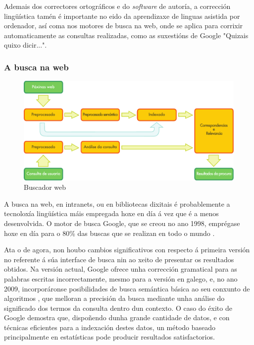 \begin{multicols}{2}
Ademais dos correctores ortográficos e do \textit{software} de autoría, a corrección lingüística tamén é importante no eido da aprendizaxe de linguas asistida por ordenador, así coma nos motores de busca na web, onde se aplica para corrixir automaticamente as consultas realizadas, como as suxestións de Google "Quizais quixo dicir...". 


\subsubsection{A busca na web}

\begin{figure}[htb]
  \center
  \includegraphics[width=\textwidth]{../_media/galician/web_search_architecture}
  \caption{Buscador web}
  \label{fig:websearcharch_ga}
\end{figure}

A busca na web, en intranets, ou en bibliotecas dixitais é probablemente a tecnoloxía lingüística máis empregada hoxe en día á vez que é a menos desenvolvida. O motor de busca Google, que se creou no ano 1998, emprégase hoxe en día para o 80\% das buscas que se realizan en todo o mundo \cite{googleleavesbehind}.

Ata o de agora, non houbo cambios significativos con respecto á primeira versión no referente á súa interface de busca nin ao xeito de presentar os resultados obtidos. Na versión actual, Google ofrece unha corrección gramatical para as palabras escritas incorrectamente, mesmo para a versión en galego, e, no ano 2009, incorporáronse posibilidades de busca semántica básica ao seu conxunto de algoritmos \cite{googlesemanticsearch}, que melloran a precisión da busca mediante unha análise do significado dos termos da consulta dentro dun contexto. O caso do éxito de Google demostra que, dispoñendo dunha grande cantidade de datos, e con técnicas eficientes para a indexación destes datos, un método baseado principalmente en estatísticas pode producir resultados satisfactorios. 


\end{multicols}
